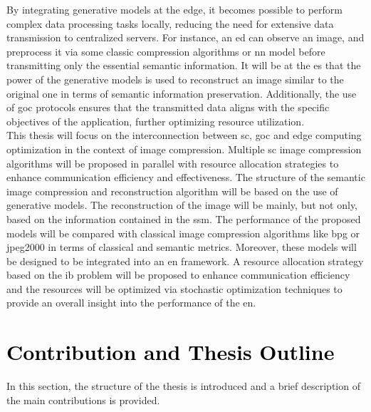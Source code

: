 By integrating generative models at the edge, it becomes possible to perform complex data processing tasks locally, reducing the need for extensive data transmission to centralized servers. For instance, an \gls{ed} can observe an image, and preprocess it via some classic compression algorithms or \gls{nn} model before transmitting only the essential semantic information. It will be at the \gls{es} that the power of the generative models is used to reconstruct an image similar to the original one in terms of semantic information preservation. Additionally, the use of \gls{goc} protocols ensures that the transmitted data aligns with the specific objectives of the application, further optimizing resource utilization.\\

This thesis will focus  on the interconnection between \gls{sc}, \gls{goc} and edge computing optimization in the context of image compression. Multiple \gls{sc} image compression algorithms will be proposed in parallel with resource allocation strategies to enhance communication efficiency and effectiveness. The structure of the semantic image compression and reconstruction algorithm will be based on the use of generative models. The reconstruction of the image will be mainly, but not only, based on the information contained in the \gls{ssm}. The performance of the proposed models will be compared with classical image compression algorithms like \gls{bpg} or \gls{jpeg2000} in terms of classical and semantic metrics. Moreover, these models will be designed to be integrated into an \gls{en} framework. A resource allocation strategy based on the \gls{ib} problem \cite{Tishby1999IB,Tishby2015DNNIB} will be proposed to enhance communication efficiency and the resources will be optimized via stochastic optimization techniques to provide an overall insight into the performance of the \gls{en}. 
\section{\textcolor{black}{Contribution and Thesis Outline}}

In this section, the structure of the thesis is introduced and a brief description of the main contributions is provided.

